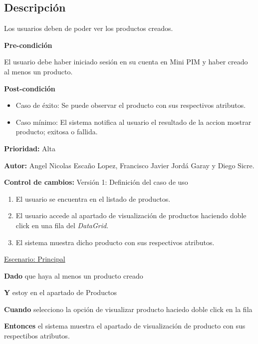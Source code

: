 {}

\subsection*{Descripción}
Los usuarios deben de poder ver los productos creados.\par
\vspace{0.15cm}

\textbf{Pre-condición}\par
El usuario debe haber iniciado sesión en su cuenta en Mini PIM y haber creado al menos un producto.\par
\vspace{0.15cm}

\textbf{Post-condición}
\begin{itemize}
    \item Caso de éxito: Se puede observar el producto con sus respectivos atributos.
    \item Caso mínimo: El sistema notifica al usuario el resultado de la accion mostrar producto; exitosa o fallida.
\end{itemize}

\textbf{Prioridad: }
Alta
\vspace{0.15cm}

\textbf{Autor: }
Angel Nicolas Escaño Lopez, Francisco Javier Jordá Garay y Diego Sicre.\par
\vspace{0.15cm}

\textbf{Control de cambios: } Versión 1: Definición del caso de uso

\begin{enumerate}
    \item El usuario se encuentra en el listado de productos.
    \item El usuario accede al apartado de visualización de productos haciendo doble click en una fila del \textit{DataGrid}.
    \item El sistema muestra dicho producto con sus respectivos atributos.
\end{enumerate}

\underline{Escenario: Principal}\par
\vspace{0.15cm}
\textbf{Dado} que haya al menos un producto creado\par
\textbf{Y} estoy en el apartado de Productos\par
\textbf{Cuando} selecciono la opción de visualizar producto haciedo doble click en la fila\par
\textbf{Entonces} el sistema muestra el apartado de visualización de producto con sus respectibos atributos.\par
\vspace{0.20cm}




